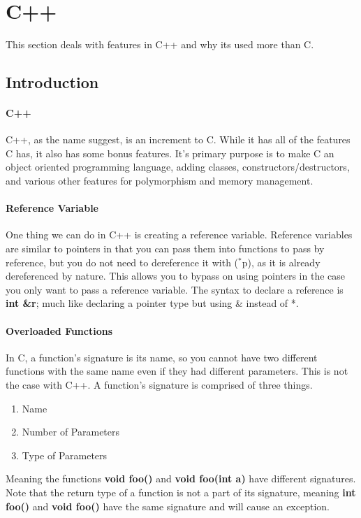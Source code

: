\section{C++}
This section deals with features in C++ and why its used more than C.
\subsection{Introduction}
\paragraph{C++} C++, as the name suggest, is an increment to C. While it has all of the features C has, it also has some bonus features. It's primary purpose is to make C an object oriented programming language, adding classes, constructors/destructors, and various other features for polymorphism and memory management.
\paragraph{Reference Variable} One thing we can do in C++ is creating a reference variable. Reference variables are similar to pointers in that you can pass them into functions to pass by reference, but you do not need to dereference it with ($^*$p), as it is already dereferenced by nature. This allows you to bypass on using pointers in the case you only want to pass a reference variable. The syntax to declare a reference is \textbf{int \&r}; much like declaring a pointer type but using \& instead of *.
\paragraph{Overloaded Functions} In C, a function's signature is its name, so you cannot have two different functions with the same name even if they had different parameters. This is not the case with C++. A function's signature is comprised of three things.
\begin{enumerate}
	\item Name
	\item Number of Parameters
	\item Type of Parameters
\end{enumerate}
Meaning the functions \textbf{void foo()} and \textbf{void foo(int a)} have different signatures. Note that the return type of a function is not a part of its signature, meaning \textbf{int foo()} and \textbf{void foo()} have the same signature and will cause an exception.

